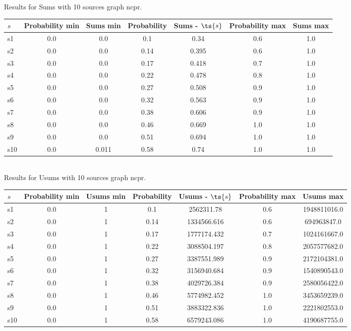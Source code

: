 \documentclass{article}
\begin{document}
\noindent Results for Sums with 10 sources graph ncpr.

\noindent\begin{tabular}{|l|c|c|c|c|c|c|}
\hline
$s$& Probability min & Sums min & Probability & Sums - $\ts{s}$ & Probability max & Sums max\\
\hline
s1 &0.0 & 0.0 & 0.1 & 0.34 & 0.6 & 1.0\\
\hline
s2 &0.0 & 0.0 & 0.14 & 0.395 & 0.6 & 1.0\\
\hline
s3 &0.0 & 0.0 & 0.17 & 0.418 & 0.7 & 1.0\\
\hline
s4 &0.0 & 0.0 & 0.22 & 0.478 & 0.8 & 1.0\\
\hline
s5 &0.0 & 0.0 & 0.27 & 0.508 & 0.9 & 1.0\\
\hline
s6 &0.0 & 0.0 & 0.32 & 0.563 & 0.9 & 1.0\\
\hline
s7 &0.0 & 0.0 & 0.38 & 0.606 & 0.9 & 1.0\\
\hline
s8 &0.0 & 0.0 & 0.46 & 0.669 & 1.0 & 1.0\\
\hline
s9 &0.0 & 0.0 & 0.51 & 0.694 & 1.0 & 1.0\\
\hline
s10 &0.0 & 0.011 & 0.58 & 0.74 & 1.0 & 1.0\\
\hline
\end{tabular}\\

\noindent Results for Usums with 10 sources graph ncpr.

\noindent\begin{tabular}{|l|c|c|c|c|c|c|}
\hline
$s$& Probability min & Usums min & Probability & Usums - $\ts{s}$ & Probability max & Usums max\\
\hline
s1 &0.0 & 1 & 0.1 & 2562311.78 & 0.6 & 1948811016.0\\
\hline
s2 &0.0 & 1 & 0.14 & 1334566.616 & 0.6 & 694963847.0\\
\hline
s3 &0.0 & 1 & 0.17 & 1777174.432 & 0.7 & 1024161667.0\\
\hline
s4 &0.0 & 1 & 0.22 & 3088504.197 & 0.8 & 2057577682.0\\
\hline
s5 &0.0 & 1 & 0.27 & 3387551.989 & 0.9 & 2172104381.0\\
\hline
s6 &0.0 & 1 & 0.32 & 3156940.684 & 0.9 & 1540890543.0\\
\hline
s7 &0.0 & 1 & 0.38 & 4029726.384 & 0.9 & 2580056422.0\\
\hline
s8 &0.0 & 1 & 0.46 & 5774982.452 & 1.0 & 3453659239.0\\
\hline
s9 &0.0 & 1 & 0.51 & 3883322.836 & 1.0 & 2221802553.0\\
\hline
s10 &0.0 & 1 & 0.58 & 6579243.086 & 1.0 & 4190687755.0\\
\hline
\end{tabular}\\
\end{document}
